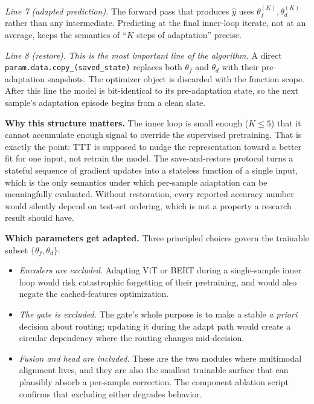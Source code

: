 \documentclass[conference]{IEEEtran}
\begin{document}
\textit{Line 7 (adapted prediction).} The forward pass that produces
$\hat{y}$ uses $\theta_f^{(K)}, \theta_d^{(K)}$ rather than any
intermediate. Predicting at the final inner-loop iterate, not at an
average, keeps the semantics of ``$K$ steps of adaptation'' precise.

\textit{Line 8 (restore).} \emph{This is the most important line of the
algorithm.} A direct \texttt{param.data.copy\_(saved\_state)} replaces
both $\theta_f$ and $\theta_d$ with their pre-adaptation snapshots. The
optimizer object is discarded with the function scope. After this line
the model is bit-identical to its pre-adaptation state, so the next
sample's adaptation episode begins from a clean slate.

\textbf{Why this structure matters.} The inner loop is small enough
($K \le 5$) that it cannot accumulate enough signal to override the
supervised pretraining. That is exactly the point: TTT is supposed to
nudge the representation toward a better fit for one input, not retrain
the model. The save-and-restore protocol turns a stateful sequence of
gradient updates into a stateless function of a single input, which is
the only semantics under which per-sample adaptation can be meaningfully
evaluated. Without restoration, every reported accuracy number would
silently depend on test-set ordering, which is not a property a
research result should have.

\textbf{Which parameters get adapted.} Three principled choices govern
the trainable subset $\{\theta_f, \theta_d\}$:

\begin{itemize}
\item \emph{Encoders are excluded.} Adapting ViT or BERT during a
single-sample inner loop would risk catastrophic forgetting of their
pretraining, and would also negate the cached-features optimization.
\item \emph{The gate is excluded.} The gate's whole purpose is to make
a stable \emph{a priori} decision about routing; updating it during the
adapt path would create a circular dependency where the routing changes
mid-decision.
\item \emph{Fusion and head are included.} These are the two modules
where multimodal alignment lives, and they are also the smallest
trainable surface that can plausibly absorb a per-sample correction.
The component ablation script confirms that excluding either degrades
behavior.
\end{itemize}
\end{document}
